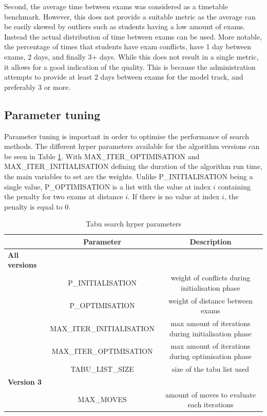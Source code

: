 Second, the average time between exams was considered as a timetable benchmark. However, this does not provide a suitable metric as the average can be easily skewed by outliers such as students having a low amount of exams. Instead the actual distribution of time between exams can be used. More notable, the percentage of times that students have exam conflicts, have 1 day between exams, 2 days, and finally 3+ days. While this does not result in a single metric, it allows for a good indication of the quality. This is because the administration attempts to provide at least 2 days between exams for the model track, and preferably 3 or more.

\subsection{Parameter tuning} \label{tuning}

Parameter tuning is important in order to optimise the performance of search methods. The different hyper parameters  available for the algorithm versions can be seen in Table \ref{tab:possible_parameters}. With MAX\_ITER\_OPTIMISATION and MAX\_ITER\_INITIALISATION defining the duration of the algorithm run time, the main variables to set are the weights. Unlike P\_INITIALISATION being a single value, P\_OPTIMISATION is a list with the value at index $i$ containing the penalty for two exams at distance $i$. If there is no value at index $i$, the penalty is equal to 0.

\begin{table}[h]
	\caption{Tabu search hyper parameters}
	\label{tab:possible_parameters}
	\centering
	\begin{tabular}{l c c}
		\hline
		& \textbf{Parameter} & \textbf{Description}  \\ \hline
        \textbf{All versions} & &\\ 
		& P\_INITIALISATION & weight of conflicts during initialisation phase \\
        & P\_OPTIMISATION  & weight of distance between exams\\
	    & MAX\_ITER\_INITIALISATION & max amount of iterations during initialisation phase \\
        & MAX\_ITER\_OPTIMISATION & max amount of iterations during optimisation phase\\ 
        & TABU\_LIST\_SIZE & size of the tabu list used\\
        \textbf{Version 3} & &\\ 
        & MAX\_MOVES & amount of moves to evaluate each iterations \\ 
        \hline
	\end{tabular}
\end{table}





